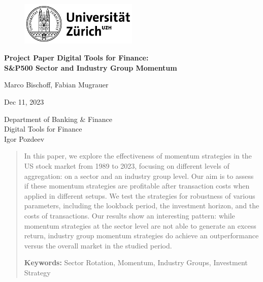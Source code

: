 \documentclass[a4paper,12pt,twoside]{article}
\begin{document}
	\begin{titlepage}
		\centering
		\begin{figure}[!h]
			\centering
			\includegraphics[width=0.5\textwidth]{UZH.png}
		\end{figure}
		\Large{\textbf{Project Paper Digital Tools for Finance: \\ S\&P500 Sector and Industry Group Momentum}\\}

		
		\vfill
		
		\large{Marco Bischoff, Fabian Mugrauer\\}
		
		\vfill
			
		\large{Dec 11, 2023}
		
		\vfill
		\vfill
	
		\large{Department of Banking \& Finance \\ Digital Tools for Finance \\ Igor Pozdeev\\ }
	
		\vfill
		\begin{abstract}
            In this paper, we explore the effectiveness of momentum strategies in the US stock market from 1989 to 2023, focusing on different levels of aggregation: on a sector and an industry group level. Our aim is to assess if these momentum strategies are profitable after transaction costs when applied in different setups. We test the strategies for robustness of various parameters, including the lookback period, the investment horizon, and the costs of transactions. Our results show an interesting pattern: while momentum strategies at the sector level are not able to generate an excess return, industry group momentum strategies do achieve an outperformance versus the overall market in the studied period. 
			
			\vspace{3mm}
			
			\textbf{Keywords:} Sector Rotation, Momentum, Industry Groups, Investment Strategy
		\end{abstract}
		
		
	\end{titlepage}
\end{document}
